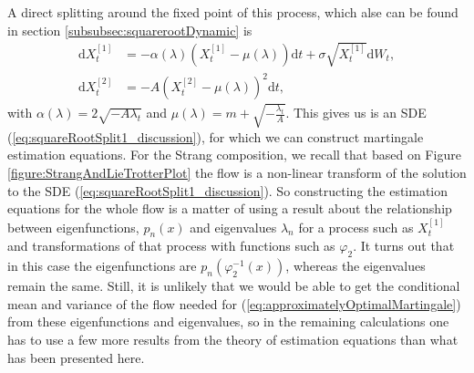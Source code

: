 A direct splitting around the fixed point of this process, which alse can be found in section \ref{subsubsec:squarerootDynamic} is
\begin{align}
    \mathrm{d}X_t^{[1]} &= -\alpha(\lambda)\left(X_t^{[1]} - \mu(\lambda)\right)  \mathrm{d}t + \sigma \sqrt{X_t^{[1]}} \mathrm{d}W_t, \label{eq:squareRootSplit1_discussion} \\
    \mathrm{d}X_t^{[2]} &= - A \left(X_t^{[2]} - \mu(\lambda)\right)^2 \mathrm{d}t, \label{eq:squareRootSplit2_discussion}
\end{align}
with $\alpha(\lambda) = 2\sqrt{-A\lambda_t}$ and $\mu(\lambda) = m + \sqrt{-\frac{\lambda_t}{A}}$. This gives us is an SDE (\ref{eq:squareRootSplit1_discussion}), for which we can construct martingale estimation equations. For the Strang composition, we recall that based on Figure \ref{figure:StrangAndLieTrotterPlot} the flow is a non-linear transform of the solution to the SDE (\ref{eq:squareRootSplit1_discussion}). So constructing the estimation equations for the whole flow is a matter of using a result about the relationship between eigenfunctions, $p_n(x)$ and eigenvalues $\lambda_n$ for a process such as $X_t^{[1]}$ and transformations of that process with functions such as $\varphi_2$. It turns out \cite[remark on p. 41]{StatisticalMethodsForSDE} that in this case the eigenfunctions are $p_n\left(\varphi_2^{-1}(x)\right)$, whereas the eigenvalues remain the same. Still, it is unlikely that we would be able to get the conditional mean and variance of the flow needed for (\ref{eq:approximatelyOptimalMartingale}) from these eigenfunctions and eigenvalues, so in the remaining calculations one has to use a few more results from the theory of estimation equations than what has been presented here.
\newpage
